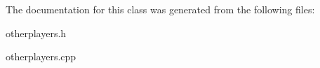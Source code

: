\-The documentation for this class was generated from the following files\-:\begin{DoxyCompactItemize}
\item 
otherplayers.\-h\item 
otherplayers.\-cpp\end{DoxyCompactItemize}
